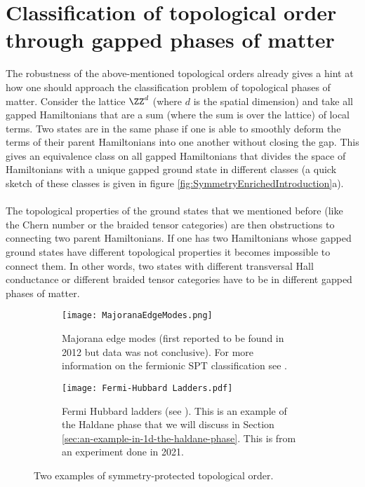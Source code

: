 \section{Classification of topological order through gapped phases of matter}
The robustness of the above-mentioned topological orders already gives a hint at how one should approach the classification problem of topological phases of matter. Consider the lattice $\ZZ^d$ (where $d$ is the spatial dimension) and take all gapped Hamiltonians that are a sum (where the sum is over the lattice) of local terms. Two states are in the same phase if one is able to smoothly deform the terms of their parent Hamiltonians into one another without closing the gap. This gives an equivalence class on all gapped Hamiltonians that divides the space of Hamiltonians with a unique gapped ground state in different classes (a quick sketch of these classes is given in figure \ref{fig:SymmetryEnrichedIntroduction}a).
\\\\
The topological properties of the ground states that we mentioned before (like the Chern number or the braided tensor categories) are then obstructions to connecting two parent Hamiltonians. If one has two Hamiltonians whose gapped ground states have different topological properties it becomes impossible to connect them. In other words, two states with different transversal Hall conductance or different braided tensor categories have to be in different gapped phases of matter.
\begin{figure}
	\begin{subfigure}[b]{0.45\textwidth}
		\centering
		\texttt{[image: MajoranaEdgeModes.png]}
		\caption{Majorana edge modes (first reported to be found in 2012 but data was not conclusive). For more information on the fermionic SPT classification see \cite{Bourne_2021}.}
	\end{subfigure}
	\hfil
	\begin{subfigure}[b]{0.45\textwidth}
		\centering
		\texttt{[image: Fermi-Hubbard Ladders.pdf]}
		\caption{Fermi Hubbard ladders (see \cite{sompet2022realizing}). This is an example of the Haldane phase that we will discuss in Section \ref{sec:an-example-in-1d-the-haldane-phase}. This is from an experiment done in 2021.}
	\end{subfigure}
	\caption{Two examples of symmetry-protected topological order.}
	\label{fig:SymmetryProtectedTopologicalOrderFigures}
\end{figure}
